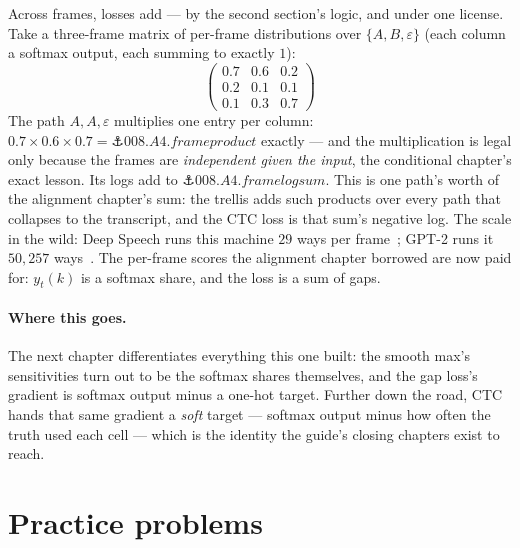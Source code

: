 \begin{narrative}
Across frames, losses add — by the second section's logic, and under
one license. Take a three-frame matrix of per-frame distributions
over $\{A, B, \varepsilon\}$ (each column a softmax output, each
summing to exactly $1$):
\[
  \begin{pmatrix} 0.7 & 0.6 & 0.2 \\ 0.2 & 0.1 & 0.1 \\
                  0.1 & 0.3 & 0.7 \end{pmatrix}
\]
The path $A, A, \varepsilon$ multiplies one entry per column:
$0.7 \times 0.6 \times 0.7 = \anchor{008.A4.frameproduct}$ exactly —
and the multiplication is legal only because the frames are
\emph{independent given the input}, the conditional chapter's exact
lesson. Its logs add to $\anchor{008.A4.framelogsum}$. This is one
path's worth of the alignment chapter's sum: the trellis adds such
products over every path that collapses to the transcript, and the
CTC loss is that sum's negative log. The scale in the wild: Deep
Speech runs this machine $29$ ways per
frame~\cite{probability-awni-hannun-et-al-deep-speech-scaling-up-end-to-end-speech-r};
GPT-2 runs it $50{,}257$
ways~\cite{probability-language-models-are-unsupervised-multitask-learners-gpt-2}.
The per-frame scores the alignment chapter borrowed are now paid for:
$y_t(k)$ is a softmax share, and the loss is a sum of gaps.

\paragraph{Where this goes.} The next chapter differentiates
everything this one built: the smooth max's sensitivities turn out to
be the softmax shares themselves, and the gap loss's gradient is
softmax output minus a one-hot target. Further down the road, CTC
hands that same gradient a \emph{soft} target — softmax output minus
how often the truth used each cell — which is the identity the
guide's closing chapters exist to reach.
\end{narrative}

\section*{Practice problems}

